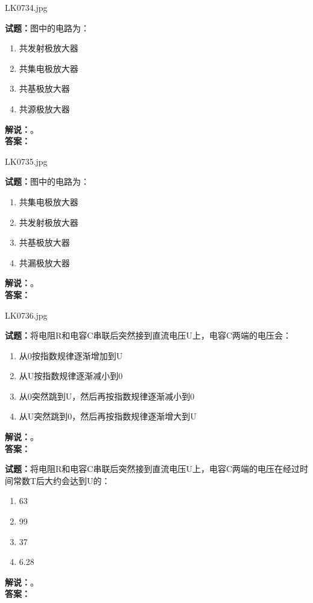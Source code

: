 \documentclass{ctexbook}
\begin{document}
\bigskip

LK0734.jpg

\noindent\textbf{试题：}图中的电路为：
\begin{enumerate}[leftmargin=3em]
  \item 共发射极放大器
  \item 共集电极放大器
  \item 共基极放大器
  \item 共源极放大器
\end{enumerate}
\noindent\textbf{解说：}\textbf{}。\\\noindent\textbf{答案：}

\bigskip

LK0735.jpg

\noindent\textbf{试题：}图中的电路为：
\begin{enumerate}[leftmargin=3em]
  \item 共集电极放大器
  \item 共发射极放大器
  \item 共基极放大器
  \item 共漏极放大器
\end{enumerate}
\noindent\textbf{解说：}\textbf{}。\\\noindent\textbf{答案：}

\bigskip

LK0736.jpg

\noindent\textbf{试题：}将电阻R和电容C串联后突然接到直流电压U上，电容C两端的电压会：
\begin{enumerate}[leftmargin=3em]
  \item 从0按指数规律逐渐增加到U
  \item 从U按指数规律逐渐减小到0
  \item 从0突然跳到U，然后再按指数规律逐渐减小到0
  \item 从U突然跳到0，然后再按指数规律逐渐增大到U
\end{enumerate}
\noindent\textbf{解说：}\textbf{}。\\\noindent\textbf{答案：}

\bigskip

\noindent\textbf{试题：}将电阻R和电容C串联后突然接到直流电压U上，电容C两端的电压在经过时间常数T后大约会达到U的：
\begin{enumerate}[leftmargin=3em]
  \item 63%
  \item 99%
  \item 37%
  \item 6.28%
\end{enumerate}
\noindent\textbf{解说：}\textbf{}。\\\noindent\textbf{答案：}
\end{document}
